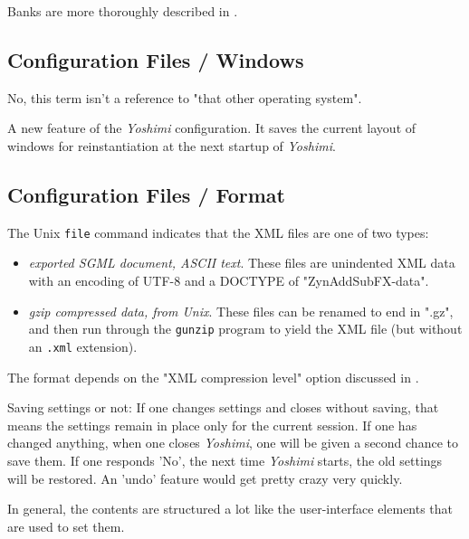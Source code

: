    Banks are more thoroughly described in
   .

\subsection{Configuration Files / Windows}
\label{subsec:configuration_windows}

   No, this term isn't a reference to "that other operating system".

   A new feature of the \textsl{Yoshimi} configuration.  It saves the current
   layout of windows for reinstantiation at the next startup of
   \textsl{Yoshimi}.

\subsection{Configuration Files / Format}
\label{subsec:configuration_file_format}

   The Unix \texttt{file} command indicates that the XML files are one of
   two types:

   \begin{itemize}
      \item \textsl{exported SGML document, ASCII text}.
         These files are unindented XML data with an encoding of UTF-8 and
         a DOCTYPE of "ZynAddSubFX-data".
      \item \textsl{gzip compressed data, from Unix}.
         These files can be renamed to end in ".gz", and then run through
         the \texttt{gunzip} program to yield the XML file (but without an
         \texttt{.xml} extension).
   \end{itemize}

   The format depends on the "XML compression level" option discussed in
   .

   Saving settings or not:
   If one changes settings and closes without saving, that means the settings
   remain in place only for the current session. If one has changed anything,
   when one closes \textsl{Yoshimi}, one will be given a second chance to
   save them. If one responds 'No',  the next time \textsl{Yoshimi} starts,
   the old settings will be restored.  An 'undo' feature would get pretty
   crazy very quickly.

   In general, the contents are structured a lot like the
   user-interface elements that are used to set them.

